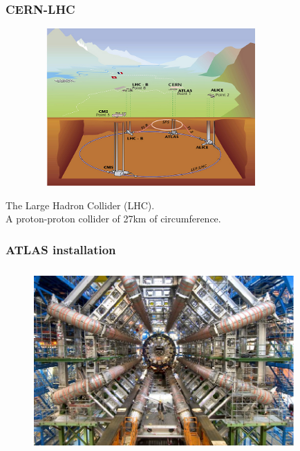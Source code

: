 \documentclass[9pt]{beamer}
\begin{document}
\begin{frame}[fragile]
\frametitle{CERN-LHC}

\begin{figure}[h]
\begin{center}
\includegraphics[width=9cm,height=6cm]{_figs/cernring-l.jpg}
\end{center}

\end{figure}

	\begin{block}{}
		The Large Hadron Collider (LHC).\\
A proton-proton collider of 27km of circumference.
	\end{block}{}


\end{frame}

\begin{frame}[fragile]
\frametitle{ATLAS installation}


\begin{figure}[h]
\begin{center}
\includegraphics[width=10cm,height=7cm]{_figs/ATLAS-pit.png}
\end{center}

\end{figure}


\end{frame}
\end{document}
